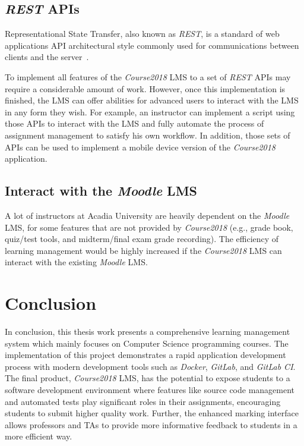 \subsection{\emph{REST} APIs}
Representational State Transfer, also known as \emph{REST}, is a standard of
web applications API architectural style commonly used for communications
between clients and the server~\citep[Chapter 5]{REST}.

To implement all features of the \emph{Course2018} LMS to a set of \emph{REST} APIs
may require a considerable amount of work. However, once this implementation is
finished, the LMS can offer abilities for advanced users to interact with the
LMS in any form they
wish. For example, an instructor can implement a script using those APIs to
interact with the LMS and fully automate the process of assignment management
to satisfy his own workflow. In addition, those sets of APIs can be used
to implement a mobile device version of the \emph{Course2018} application.

\subsection{Interact with the \emph{Moodle} LMS}
A lot of instructors at Acadia University are heavily dependent on the
\emph{Moodle} LMS, for some features that are not provided by
\emph{Course2018} (e.g., grade book, quiz/test tools, and midterm/final
exam grade recording). The efficiency of learning management would be
highly increased if the \emph{Course2018} LMS can interact with the existing
\emph{Moodle} LMS\null.


\section{Conclusion}
In conclusion, this thesis work presents a comprehensive
learning management system which mainly focuses on Computer Science
programming courses. The implementation of this project demonstrates
a rapid application development process with modern development tools
such as \emph{Docker}, \emph{GitLab}, and \emph{GitLab CI}\null.
The final product, \emph{Course2018} LMS, has the potential to expose
students to a software development environment where features like source
code management and
automated tests play significant roles in their assignments, encouraging
students to submit higher quality work.
Further,
the enhanced marking interface allows professors and TAs to provide more
informative feedback to students in a more efficient way.